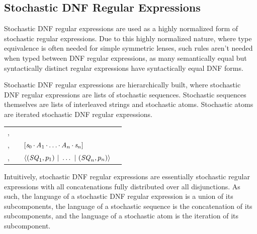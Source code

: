 \documentclass[acmsmall,screen,anonymous]{acmart}
\begin{document}
\subsection{Stochastic DNF Regular Expressions}
Stochastic DNF regular expressions are used as a highly normalized form of
stochastic regular expressions. Due to this highly normalized nature, where type
equivalence is often needed for simple symmetric lenses, such rules aren't
needed when typed between DNF regular expressions, as many semantically equal
but syntactically distinct regular expressions have syntactically equal DNF
forms.

Stochastic DNF regular expressions are hierarchically built, where stochastic
DNF regular expressions are lists of stochastic sequences. Stochastic sequences
themselves are lists of interleaved strings and stochastic atoms.  Stochastic
atoms are iterated stochastic DNF regular expressions.
\begin{center}
  \begin{tabular}{l@{\ }c@{\ }l@{\ }>{\itshape\/}r}
    \Atom{},\AtomAlt{} & \GEq{} & \PRegexStar{\DNFRegex{}}{\Probability}
\\
    \Sequence{},\SequenceAlt{} & \GEq{} &
                                                       $[\mathit{s}_0\mkern-1mu\cdot\mkern-1mu\mathit{A}_1\mkern-1mu\cdot\mkern-1mu\ldots\mkern-1mu\cdot\mkern-1mu\mathit{A}_n\mkern-1mu\cdot\mkern-1mu\mathit{s}_n]$ 
\\
    \DNFRegex{},\DNFRegexAlt{} & \GEq{} & $\langle(\mathit{SQ}_1,p_1)~|~\ldots~|~(\mathit{SQ}_n,p_n)\rangle$ %
  \end{tabular}
\end{center}

Intuitively, stochastic DNF regular expressions are essentially stochastic
regular expressions with all concatenations fully distributed over all
disjunctions. As such, the language of a stochastic DNF regular expression is a
union of its subcomponents, the language of a stochastic sequence is the
concatenation of its subcomponents, and the language of a stochastic atom is the
iteration of its subcomponent.
\end{document}
